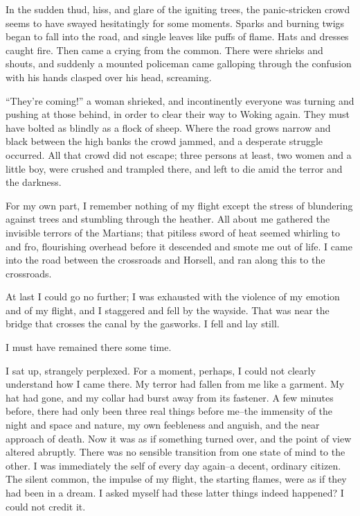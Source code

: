 In the sudden thud, hiss, and glare of the igniting trees, the
panic-stricken crowd seems to have swayed hesitatingly for some
moments. Sparks and burning twigs began to fall into the road, and
single leaves like puffs of flame. Hats and dresses caught fire.
Then came a crying from the common. There were shrieks and shouts,
and suddenly a mounted policeman came galloping through the
confusion with his hands clasped over his head, screaming.

``They're coming!'' a woman shrieked, and incontinently everyone was
turning and pushing at those behind, in order to clear their way to
Woking again. They must have bolted as blindly as a flock of sheep.
Where the road grows narrow and black between the high banks the
crowd jammed, and a desperate struggle occurred. All that crowd did
not escape; three persons at least, two women and a little boy,
were crushed and trampled there, and left to die amid the terror
and the darkness.

For my own part, I remember nothing of my flight except the stress
of blundering against trees and stumbling through the heather. All
about me gathered the invisible terrors of the Martians; that
pitiless sword of heat seemed whirling to and fro, flourishing
overhead before it descended and smote me out of life. I came into
the road between the crossroads and Horsell, and ran along this to
the crossroads.

At last I could go no further; I was exhausted with the violence of
my emotion and of my flight, and I staggered and fell by the
wayside. That was near the bridge that crosses the canal by the
gasworks. I fell and lay still.

I must have remained there some time.

I sat up, strangely perplexed. For a moment, perhaps, I could not
clearly understand how I came there. My terror had fallen from me
like a garment. My hat had gone, and my collar had burst away from
its fastener. A few minutes before, there had only been three real
things before me--the immensity of the night and space and nature,
my own feebleness and anguish, and the near approach of death. Now
it was as if something turned over, and the point of view altered
abruptly. There was no sensible transition from one state of mind
to the other. I was immediately the self of every day again--a
decent, ordinary citizen. The silent common, the impulse of my
flight, the starting flames, were as if they had been in a dream. I
asked myself had these latter things indeed happened? I could not
credit it.

